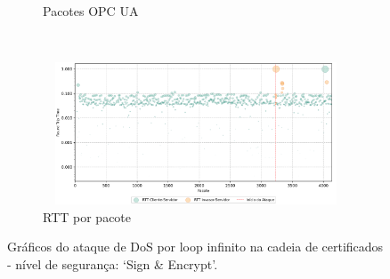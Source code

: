 \begin{apendicesenv}
\begin{figure}[htbp!]
\begin{subfigure}[t]{0.5\textwidth}
        \caption{Pacotes OPC UA}
    \end{subfigure}%
    ~
    \begin{subfigure}[t]{0.5\textwidth}
        \centering
        \includegraphics[width=1\textwidth, height=120pt]{USPSC-img/output/cropped/2-dos_certificate_inf_chain_loop-rttp.png}
        \caption{RTT por pacote}
    \end{subfigure}%
    \label{fig:2-dos_certificate_inf_chain_loop}
    \caption{Gráficos do ataque de DoS por loop infinito na cadeia de certificados - nível de segurança: `Sign \& Encrypt'.}
\end{figure}


\end{apendicesenv}
